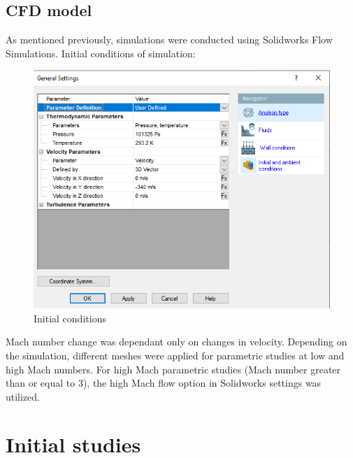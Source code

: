 \documentclass{article}
\begin{document}
\subsection{CFD model}

As mentioned previously, simulations were conducted using Solidworks Flow Simulations. Initial conditions of simulation:

\begin{figure}[H]
\centering
\includegraphics{GENERALSETTING}
\caption{Initial conditions}
\label{fig:GENERALSETTING}
\end{figure}

Mach number change was dependant only on changes in velocity. Depending on the simulation, different meshes were applied for parametric studies at low and high Mach numbers. For high Mach parametric studies (Mach number greater than or equal to 3), the high Mach flow option in Solidworks settings was utilized.


\section{Initial studies}
\end{document}
